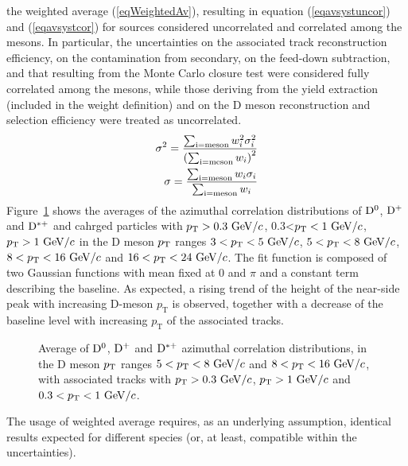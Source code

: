 the weighted average (\ref{eqWeightedAv}), resulting in equation (\ref{eqavsystuncor}) and (\ref{eqavsystcor}) for sources
considered uncorrelated and correlated among the mesons. In particular, the uncertainties on the associated track reconstruction efficiency, on the
contamination from secondary, on the feed-down subtraction, and that resulting from the Monte Carlo closure test were considered fully correlated among
the mesons, while those deriving from the yield extraction (included in the weight definition) and on the D meson reconstruction and selection efficiency were treated as uncorrelated.
\begin{eqnarray}
  \sigma^{2}=\frac{\sum_{\rm i=meson}w_{i}^{2}\sigma^{2}_{i}}{\left( \sum_{\rm i=meson}w_{i}\right)^{2}}  \label{eqavsystuncor}\\
  \sigma=\frac{\sum_{\rm i=meson}w_{i}\sigma_{i}}{ \sum_{\rm i=meson}w_{i}}   \label{eqavsystcor}
\end{eqnarray}
Figure~\ref{fig:DmesonAverage} shows the averages of the azimuthal correlation distributions of ${\rm D^0}$, ${\rm D^+}$ and ${\rm D^{*+}}$ and cahrged particles with $p_{\rm T}>0.3~\mathrm{GeV}/c$, 0.3<$p_{\rm T}<1~\mathrm{GeV}/c$, $p_{\rm T}>1~\mathrm{GeV}/c$ in the D meson $p_{\rm T}$ ranges $3<p_{\rm T}<5~\mathrm{GeV}/c$, $5<p_{\rm T}<8~\mathrm{GeV}/c$, $8<p_{\rm T}<16~\mathrm{GeV}/c$ and $16<p_{\rm T}<24~\mathrm{GeV}/c$. The fit function is composed of two Gaussian functions with mean fixed at 0 and $\pi$ and a constant term describing the baseline. %
As expected, a rising trend of the height of the near-side peak with increasing D-meson $p_\mathrm{T}$ is observed, together with a decrease of the baseline level with increasing $p_\mathrm{T}$ of the associated tracks.

\begin{figure}[h]
\centering
 \caption{Average of ${\rm D^0}$, ${\rm D^+}$ and ${\rm D^{*+}}$ azimuthal correlation distributions, in the D meson $p_{\rm T}$ ranges $5<p_{\rm T}<8~\mathrm{GeV}/c$ and $8<p_{\rm T}<16~\mathrm{GeV}/c$, with associated tracks with $p_{\rm T}>0.3~\mathrm{GeV}/c$, $p_{\rm T}>1~\mathrm{GeV}/c$ and $0.3 < p_{\rm T} < 1~\mathrm{GeV}/c$.} 
 \label{fig:DmesonAverage}
\end{figure}

The usage of weighted average requires, as an underlying assumption, identical results expected for different species (or, at least, compatible within the uncertainties). %

